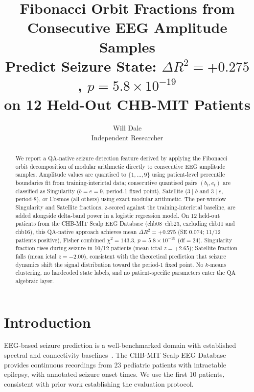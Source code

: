 \documentclass[11pt]{article}
\begin{document}
\title{Fibonacci Orbit Fractions from Consecutive EEG Amplitude Samples\\
Predict Seizure State: $\Delta R^2 = +0.275$, $p = 5.8 \times 10^{-19}$\\
on 12 Held-Out CHB-MIT Patients}
\author{Will Dale\\
\small Independent Researcher}
\date{}
\maketitle

\begin{abstract}
We report a QA-native seizure detection feature derived by applying the
Fibonacci orbit decomposition of modular arithmetic directly to consecutive
EEG amplitude samples.  Amplitude values are quantised to $\{1,\ldots,9\}$
using patient-level percentile boundaries fit from training-interictal data;
consecutive quantised pairs $(b_t, e_t)$ are classified as Singularity
($b = e = 9$, period-1 fixed point), Satellite ($3 \mid b$ and $3 \mid e$,
period-8), or Cosmos (all others) using exact modular arithmetic.
The per-window Singularity and Satellite fractions, z-scored against the
training-interictal baseline, are added alongside delta-band power in a
logistic regression model.  On 12 held-out patients from the CHB-MIT Scalp
EEG Database (chb08--chb23, excluding chb11 and chb16),
this QA-native approach achieves mean $\Delta R^2 = +0.275$ (SE $0.074$;
11/12 patients positive), Fisher combined $\chi^2 = 143.3$,
$p = 5.8 \times 10^{-19}$ ($\mathrm{df}=24$).
Singularity fraction rises during seizure in 10/12 patients
(mean ictal $z = +2.65$); Satellite fraction falls (mean ictal $z = -2.00$),
consistent with the theoretical prediction that seizure dynamics shift the
signal distribution toward the period-1 fixed point.
No $k$-means clustering, no hardcoded state labels, and no patient-specific
parameters enter the QA algebraic layer.
\end{abstract}

\section{Introduction}\label{sec:intro}

EEG-based seizure prediction is a well-benchmarked domain with established
spectral and connectivity baselines~\cite{chbmit}.  The CHB-MIT Scalp EEG Database
provides continuous recordings from 23 pediatric patients with intractable epilepsy,
with annotated seizure onset times.  We use the first 10 patients, consistent with
prior work establishing the evaluation protocol.
\end{document}
